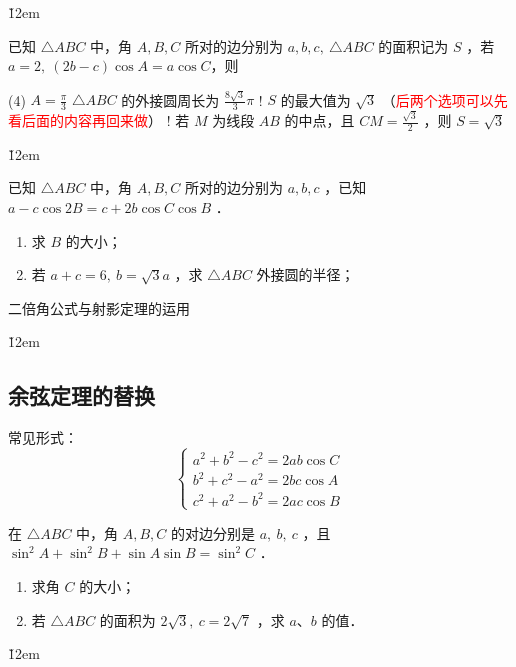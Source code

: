 \v{12em}

\begin{problem}
已知 $\triangle A B C$ 中，角 $A, B, C$ 所对的边分别为 $a, b, c, ~ \triangle A B C$ 的面积记为 $S$ ，若 $a=2, ~(2 b-c) \cos A=a \cos C$，则
\begin{tasks}(4)
    \task $A=\frac{\pi}{3}$
    \task $\triangle A B C$ 的外接圆周长为 $\frac{8 \sqrt{3}}{3} \pi$
    \task! $S$ 的最大值为 $\sqrt{3}$ （\textcolor{red}{后两个选项可以先看后面的内容再回来做}）
    \task! 若 $M$ 为线段 $A B$ 的中点，且 $C M=\frac{\sqrt{3}}{2}$ ，则 $S=\sqrt{3}$
\end{tasks}
\end{problem}

\v{12em}

\begin{example}
    已知 $\triangle A B C$ 中，角 $A, B, C$ 所对的边分别为 $a, b, c$ ，已知 $a-c \cos 2 B=c+2 b \cos C \cos B$ ．
    \begin{enumerate}
        \item 求 $B$ 的大小；

        \item 若 $a+c=6, ~ b=\sqrt{3} a$ ，求 $\triangle A B C$ 外接圆的半径；
    \end{enumerate}
\end{example}

\begin{tips}
    二倍角公式与射影定理的运用
\end{tips}

\v{12em}

\subsection{余弦定理的替换}

\begin{theorem}
    常见形式：
    $$\begin{cases}
            a^2 + b^2 - c^2 = 2ab \cos C \\
            b^2 + c^2 - a^2 = 2bc \cos A \\
            c^2 + a^2 - b^2 = 2ac \cos B
        \end{cases}$$
\end{theorem}

\begin{example}
    在 $\triangle A B C$ 中，角 $A, B, C$ 的对边分别是 $a, ~ b, ~ c$ ，且 $\sin ^2 A+\sin ^2 B+\sin A \sin B=\sin ^2 C$ ．
    \begin{enumerate}
        \item 求角 $C$ 的大小；
        \item 若 $\triangle A B C$ 的面积为 $2 \sqrt{3}, ~ c=2 \sqrt{7}$ ，求 $a$、$b$ 的值．
    \end{enumerate}
\end{example}
\v{12em}

